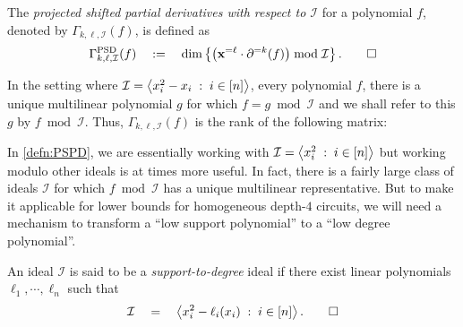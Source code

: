  \begin{definition} \label{defn:PSPD-ideal}
The \emph{projected shifted partial derivatives with respect to $\mathcal{I}$} for a polynomial $f$, denoted by $\Gamma_{k,\ell,\mathcal{I}}(f)$, is defined as 
\[
\Gamma^{\mathrm{PSD}}_{k,\ell,\mathcal{I}}(f) \quad := \quad \dim \left\{\left(\mathbf{x}^{=\ell} \cdot \partial^{=k}(f)\right) \bmod \mathcal{I}\right\}.\qedhere
\]
\end{definition}
\noindent
In the setting where $\mathcal{I} = \left\langle x_i^2 - x_i\;:\; i\in [n]\right\rangle$, every polynomial $f$, there is a unique multilinear polynomial $g$ for which $f = g \bmod \mathcal{I}$ and we shall refer to this $g$ by $f \bmod \mathcal{I}$. Thus, $\Gamma_{k,\ell,\mathcal{I}}(f)$ is the rank of the following matrix:


\noindent In \autoref{defn:PSPD}, we are essentially working with
$\mathcal{I} = \left\langle x_i^2 \;:\; i\in [n]\right\rangle$ but working modulo other ideals is at times more useful.
In fact, there is a fairly large class of ideals $\mathcal{I}$ for which $f \bmod \mathcal{I}$ has a unique multilinear representative. But to make it applicable for lower bounds for homogeneous depth-$4$ circuits, we will need a mechanism to transform a ``low support polynomial'' to a ``low degree polynomial''. 

\begin{definition}
An ideal $\mathcal{I}$ is said to be a \emph{support-to-degree} ideal if there exist linear polynomials $\ell_1, \cdots, \ell_n$ such that
\[
\mathcal{I} \quad = \quad \left\langle x_i^2 - \ell_i(x_i) \;:\; i\in [n]\right\rangle. \qedhere
\]
\end{definition}

